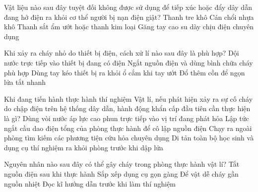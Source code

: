 \begin{ex}
Vật liệu nào sau đây tuyệt đối không được sử dụng để tiếp xúc hoặc đẩy dây dẫn đang hở điện ra khỏi cơ thể người bị nạn điện giật?
\choice
{Thanh tre khô}
{Cán chổi nhựa khô}
{\True Thanh sắt ẩm ướt hoặc thanh kim loại}
{Găng tay cao su dày chịu điện chuyên dụng}
\end{ex}

\begin{ex}
Khi xảy ra cháy nhỏ do thiết bị điện, cách xử lí nào sau đây là phù hợp?
\choice
{Dội nước trực tiếp vào thiết bị đang có điện}
{\True Ngắt nguồn điện và dùng bình chữa cháy phù hợp}
{Dùng tay kéo thiết bị ra khỏi ổ cắm khi tay ướt}
{Đổ thêm cồn để ngọn lửa tắt nhanh}
\end{ex}

\begin{ex}
Khi đang tiến hành thực hành thí nghiệm Vật lí, nếu phát hiện xảy ra sự cố cháy do chập điện trên hệ thống dây dẫn, hành động khẩn cấp đầu tiên cần thực hiện là gì?
\choice
{Dùng vòi nước áp lực cao phun trực tiếp vào vị trí đang phát hỏa}
{\True Lập tức ngắt cầu dao điện tổng của phòng thực hành để cô lập nguồn điện}
{Chạy ra ngoài phòng tìm kiếm các phương tiện cứu hỏa chuyên dụng}
{Di tản toàn bộ học sinh và dụng cụ thí nghiệm ra khỏi phòng trước khi dập lửa}
\end{ex}

\begin{ex}
Nguyên nhân nào sau đây có thể gây cháy trong phòng thực hành vật lí?
\choice
{Tắt nguồn điện sau khi thực hành}
{Sắp xếp dụng cụ gọn gàng}
{\True Để vật dễ cháy gần nguồn nhiệt}
{Đọc kĩ hướng dẫn trước khi làm thí nghiệm}
\end{ex}

